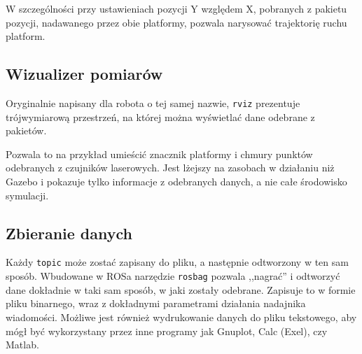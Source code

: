 		W szczególności przy ustawieniach pozycji Y względem X, pobranych z pakietu pozycji, nadawanego przez obie platformy, pozwala narysować trajektorię ruchu platform.
	\subsection{Wizualizer pomiarów}
		Oryginalnie napisany dla robota o tej samej nazwie, \texttt{rviz} prezentuje trójwymiarową przestrzeń, na której można wyświetlać 
		dane odebrane z pakietów.
		
		Pozwala to na przykład umieścić znacznik platformy i chmury punktów odebranych z czujników laserowych.
		Jest lżejszy na zasobach w działaniu niż Gazebo i pokazuje tylko informacje z odebranych danych, a nie całe środowisko symulacji.
		
	\subsection{Zbieranie danych}
		Każdy \texttt{topic} może zostać zapisany do pliku, a następnie odtworzony w ten sam sposób.
		Wbudowane w ROSa narzędzie \texttt{rosbag} pozwala ,,nagrać'' i odtworzyć dane dokładnie w taki sam sposób, w jaki zostały odebrane.
		Zapisuje to w formie pliku binarnego, wraz z dokładnymi parametrami działania nadajnika wiadomości.
		Możliwe jest również wydrukowanie danych do pliku tekstowego, aby mógł być wykorzystany przez inne programy jak Gnuplot, Calc (Exel), czy Matlab.
		
	
	
	
	
	

